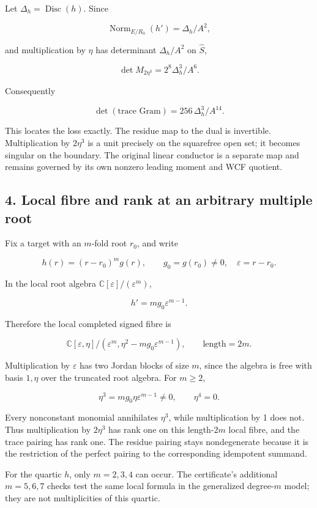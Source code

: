 Let \(\Delta_h=\operatorname{Disc}(h)\). Since

\[
 \operatorname{Norm}_{E/R_0}(h')=\Delta_h/A^2,
\]

and multiplication by \(\eta\) has determinant \(\Delta_h/A^2\) on
\(\widehat S\),

\[
 \det M_{2\eta^3}=2^8\Delta_h^3/A^6.
\]

Consequently

\[
 \boxed{\det(\text{trace Gram})=256\,\Delta_h^3/A^{14}.}
\]

This locates the loss exactly. The residue map to the dual is
invertible. Multiplication by \(2\eta^3\) is a unit precisely on the
squarefree open set; it becomes singular on the boundary. The original
linear conductor is a separate map and remains governed by its own
nonzero leading moment and WCF quotient.

\subsection{4. Local fibre and rank at an arbitrary multiple
root}\label{local-fibre-and-rank-at-an-arbitrary-multiple-root}

Fix a target with an \(m\)-fold root \(r_0\), and write

\[
 h(r)=(r-r_0)^m g(r),\qquad g_0=g(r_0)\ne0,\quad\varepsilon=r-r_0.
\]

In the local root algebra \(\mathbb C[\varepsilon]/(\varepsilon^m)\),

\[
 h'=m g_0\varepsilon^{m-1}.
\]

Therefore the local completed signed fibre is

\[
 \boxed{\mathbb C[\varepsilon,\eta]/
  (\varepsilon^m,\eta^2-mg_0\varepsilon^{m-1})},
 \qquad \text{length}=2m.
\]

Multiplication by \(\varepsilon\) has two Jordan blocks of size \(m\),
since the algebra is free with basis \(1,\eta\) over the truncated root
algebra. For \(m\ge2\),

\[
 \eta^3=mg_0\eta\varepsilon^{m-1}\ne0,\qquad \eta^4=0.
\]

Every nonconstant monomial annihilates \(\eta^3\), while multiplication
by 1 does not. Thus multiplication by \(2\eta^3\) has rank one on this
length-\(2m\) local fibre, and the trace pairing has rank one. The
residue pairing stays nondegenerate because it is the restriction of the
perfect pairing to the corresponding idempotent summand.

For the quartic \(h\), only \(m=2,3,4\) can occur. The certificate's
additional \(m=5,6,7\) checks test the same local formula in the
generalized degree-\(m\) model; they are not multiplicities of this
quartic.

